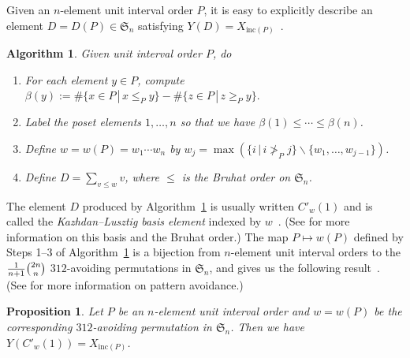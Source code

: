 \documentclass[12pt]{amsart}
\newtheorem{prop}[thm]{Proposition}
\newtheorem{alg}[thm]{Algorithm}
\numberwithin{equation}{section}
\newcommand{\sn}{\mathfrak{S}_n}
\newcommand{\defeq}{:=}
\newcommand{\inc}{\mathrm{inc}}
\newcommand{\ssm}{\smallsetminus}
\begin{document}
Given an $n$-element unit interval order $P$,
it is easy to explicitly describe
an element $D = D(P) \in \sn$
satisfying $Y(D) = X_{\inc(P)}$~\cite[\S 3]{SkanCCS}.  
\begin{alg}\label{a:PtoC}
  Given unit interval order $P$, do
  \begin{enumerate}
  \item For each element $y \in P$, compute
$\beta(y) \defeq
  \# \{ x \in P \,|\, x \leq_P y \} - \# \{ z \in P \,|\, z \geq_P y \}.$
  \item Label the poset elements $1, \dotsc, n$
so that we have
  $\beta(1) \leq \cdots \leq \beta(n)$.
\item Define $w = w(P) = w_1 \cdots w_n$ by
  $w_j = \max ( \{ i \,|\, i \not >_P j \} \ssm \{ w_1, \dotsc, w_{j-1} \} )$.
\item Define $D = \sum_{v \leq w} v$, where $\leq$ is the Bruhat order on $\sn$.
\end{enumerate}
\end{alg}
\noindent
The element $D$ produced by Algorithm~\ref{a:PtoC} is usually written
$C'_w(1)$ and is called the {\em Kazhdan--Lusztig basis element}
indexed by $w$~\cite{KLRepCH}.  (See \cite{BBCoxeter} for more
information on this basis and the Bruhat order.)
The map $P \mapsto w(P)$ defined by Steps 1--3 of Algorithm~\ref{a:PtoC}
is a bijection from $n$-element unit interval orders to the
$\tfrac{1}{n+1}\tbinom{2n}n$ $312$-avoiding permutations in $\sn$,
and gives us the following result~\cite[Cor.\,7.5]{CHSSkanEKL}.
(See \cite{BilleyLak} for more information on pattern avoidance.)
\begin{prop}\label{p:uioto312avoid}
  Let $P$ be an $n$-element unit interval order and $w = w(P)$ be the
  corresponding $312$-avoiding permutation in $\sn$.  Then we have
  $Y(C'_w(1)) = X_{\inc(P)}$.
\end{prop}
\end{document}
